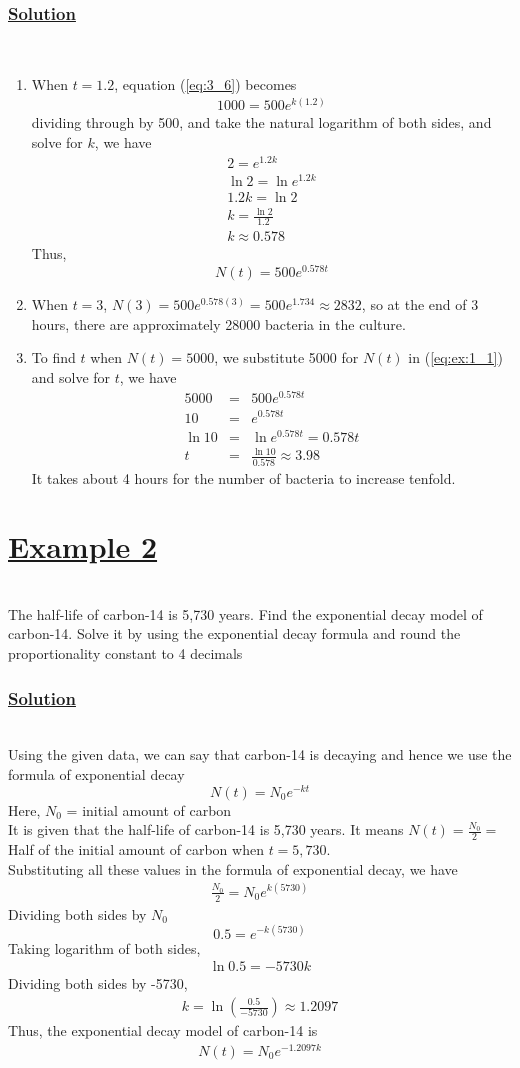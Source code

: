 \documentclass[11pt]{report}
\newcommand{\ubt}[1]{\textbf{\underline{#1}}}
\newcommand{\sps}{\\[0.2cm]}
\newcommand{\spn}[1]{\\[#1cm]}
\newcommand{\refn}[1]{(\ref{#1})}
\newcommand{\refx}[1]{\refn{eq:#1}}
\newcommand{\example}[1]{\section*{\ubt{Example #1}}{~}\spn{-1}}
\newcommand{\solution}{\subsubsection{\ubt{Solution}}{~}\spn{-1}}
\renewcommand{\labelenumi}{\arabic{enumi})}
\begin{document}
	\solution
	\begin{enumerate}
		\renewcommand{\labelenumi}{(\alph{enumi})}
		\item When $t = 1.2$, equation \refx{3_6} becomes
			\begin{eqnarray*}
				1000 = 500e^{k(1.2)}
			\end{eqnarray*}
			dividing through by 500, and take the natural logarithm of both sides, and solve for $k$, we have
			\begin{eqnarray*}
				2 = e^{1.2k}\sps
				\ln 2 = \ln e^{1.2k}\sps
				1.2k = \ln2\sps
				k=\frac{\ln 2}{1.2}\sps
				k \approx 0.578
			\end{eqnarray*}
			Thus,
			\begin{equation}
				N(t) = 500e^{0.578t}\tag{i}\label{eq:ex:1_1}
			\end{equation}
		\item When $t=3$, $N(3) = 500e^{0.578(3)}=500e^{1.734} \approx 2832$, so at the end of 3 hours, there are approximately 28000 bacteria in the culture.
		\item To find $t$ when $N(t)=5000$, we substitute 5000 for $N(t)$ in \refn{eq:ex:1_1} and solve for $t$, we have
		\begin{eqnarray*}
			5000 &=& 500e^{0.578t}\sps
			10 &=& e^{0.578t}\sps
			\ln 10 &=& \ln e^{0.578t} = 0.578t \sps
			t &=& \frac{\ln 10}{0.578} \approx 3.98
		\end{eqnarray*}
		It takes about 4 hours for the number of bacteria to increase tenfold.
	\end{enumerate}

	\example{2}
	The half-life of carbon-14 is 5,730 years. Find the exponential decay model of carbon-14. Solve it by using the exponential decay formula and round the proportionality constant to 4 decimals
	
	
	\solution
	Using the given data, we can say that carbon-14 is decaying and hence we use the formula of exponential decay
	\begin{equation*}
		N(t) = N_0e^{-kt}
	\end{equation*}
	Here, $N_0$ = initial amount of carbon\sps
	It is given that the half-life of carbon-14 is 5,730 years. It means $N(t) = \frac{N_0}{2}=$Half of the initial amount of carbon when $t=5,730$.\sps
	Substituting all these values in the formula of exponential decay, we have
	\begin{eqnarray*}
		\frac{N_0}{2} = N_0 e^{k(5730)}
	\end{eqnarray*}
	Dividing both sides by $N_0$
	\begin{equation*}
		0.5 = e^{-k(5730)}
	\end{equation*}
	Taking logarithm of both sides,
	\begin{eqnarray*}
		\ln 0.5 = -5730k
	\end{eqnarray*}
	Dividing both sides by -5730,
	\begin{eqnarray*}
		k = \ln\left(\frac{0.5}{-5730}\right) \approx 1.2097
	\end{eqnarray*}
	Thus, the exponential decay model of carbon-14 is 
	\begin{eqnarray*}
		N(t) = N_0e^{-1.2097k}
	\end{eqnarray*}
\end{document}
